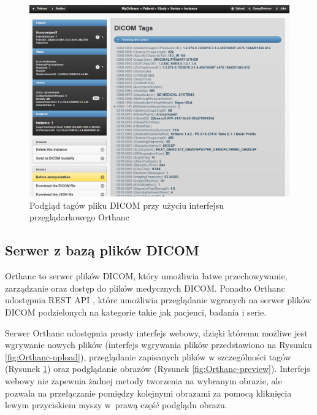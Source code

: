\documentclass[a4paper,11pt,twoside,openright]{report}
\theoremstyle{definition}
\begin{document}
\begin{figure}[tbh!]
	\center
	\includegraphics[width=1\textwidth]{Orthanc-tags}
	\caption{Podgląd tagów pliku DICOM przy użyciu interfejsu przeglądarkowego Orthanc}
    	\label{fig:Orthanc-tags}
\end{figure}

\subsection {Serwer z bazą plików DICOM}

Orthanc \cite{Orthanc} to serwer plików DICOM, który umożliwia łatwe przechowywanie,
zarządzanie oraz dostęp do plików medycznych DICOM. Ponadto Orthanc udostępnia
REST API \cite{Orthanc API}, które umożliwia przeglądanie wgranych na serwer plików DICOM podzielonych
na kategorie takie jak pacjenci, badania i serie.

Serwer Orthanc udostępnia prosty interfejs webowy, dzięki któremu możliwe jest
wgrywanie nowych plików (interfejs wgrywania plików przedstawiono na Rysunku
\ref{fig:Orthanc-upload}), przeglądanie zapisanych plików w szczególności
tagów (Rysunek \ref{fig:Orthanc-tags}) oraz podglądanie obrazów (Rysunek \ref{fig:Orthanc-preview}).
Interfejs webowy nie zapewnia żadnej metody tworzenia na wybranym obrazie, ale
pozwala na przełączanie pomiędzy kolejnymi obrazami za pomocą kliknięcia lewym
przyciskiem myszy w~prawą część podglądu obrazu.
\end{document}
